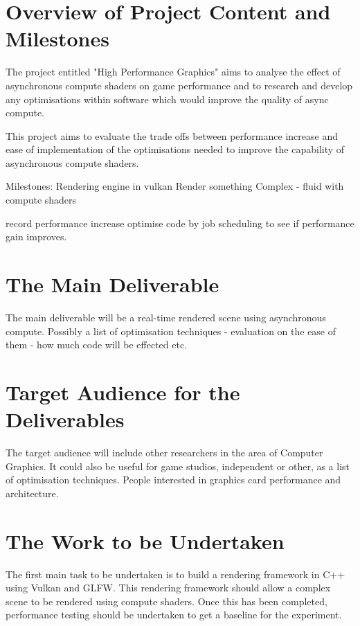 \section{Overview of Project Content and Milestones}



The project entitled "High Performance Graphics" aims to analyse the effect of asynchronous compute shaders on game performance and to research and develop any optimisations within software which would improve the quality of async compute. 


This project aims to evaluate the trade offs between performance increase and ease of implementation of the optimisations needed to improve the capability of asynchronous compute shaders.

Milestones: Rendering engine in vulkan
Render something Complex - fluid with compute shaders

record performance increase
optimise code by job scheduling to see if performance gain improves.

\section{The Main Deliverable}
The main deliverable will be a real-time rendered scene using asynchronous compute. Possibly a list of optimisation techniques - evaluation on the ease of them - how much code will be effected etc.

\section{Target Audience for the Deliverables}
The target audience will include other researchers in the area of Computer Graphics.
It could also be useful for game studios, independent or other, as a list of optimisation techniques. People interested in graphics card performance and architecture.

\section{The Work to be Undertaken}
The first main task to be undertaken is to build a rendering framework in C++ using Vulkan and GLFW. This rendering framework should allow a complex scene to be rendered using compute shaders. Once this has been completed, performance testing should be undertaken to get a baseline for the experiment.

